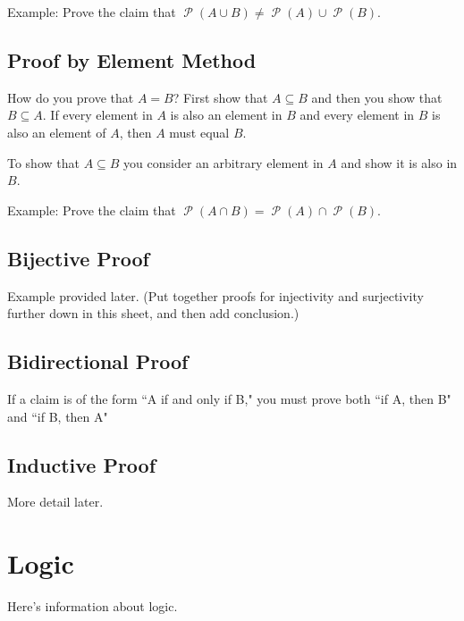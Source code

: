 \documentclass[12pt,letterpaper]{article}
\newcommand\Pow{\ensuremath{\operatorname{\mathcal{P}}}}
\begin{document}
      Example: Prove the claim that $\Pow{(A\cup B)} \not= \Pow{(A)}\cup \Pow{(B)}$.
    \begin{mdframed}\vspace{1 cm}\end{mdframed}
    
    \subsection{Proof by Element Method}
    
	How do you prove that $A = B$? First show that $A \subseteq B$ and then you show that $B \subseteq A$. If every element in $A$ is also an element in $B$ and every element in $B$ is also an element of $A$, then $A$ must equal $B$. 

	To show that $A \subseteq B$ you consider an arbitrary element in $A$ and show it is also in $B$. 

    Example: Prove the claim that $\Pow{(A\cap B)} = \Pow{(A)}\cap \Pow{(B)}$.
	\begin{mdframed}\vspace{2 cm}\end{mdframed}
    
    \subsection{Bijective Proof}
    
    Example provided later. (Put together proofs for injectivity and surjectivity further down in this sheet, and then add conclusion.)
    
    \subsection{Bidirectional Proof}
    
    If a claim is of the form ``A if and only if B," you must prove both ``if A, then B" and ``if B, then A"
    
    \subsection{Inductive Proof}
    
    More detail later.


\section{Logic}

Here's information about logic.
\end{document}
